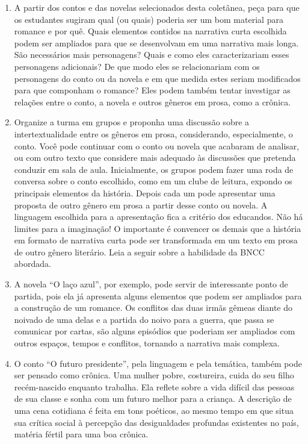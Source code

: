 \documentclass[12pt]{extarticle}
\begin{document}
\begin{enumerate}
\item
A partir dos contos e das novelas selecionados
desta coletânea, peça para que os estudantes sugiram qual (ou quais)
poderia ser um bom material para romance e por quê. Quais elementos
contidos na narrativa curta escolhida podem ser ampliados para que se
desenvolvam em uma narrativa mais longa. São necessários mais
personagens? Quais e como eles caracterizariam esses personagens
adicionais? De que modo eles se relacionariam com os personagens do
conto ou da novela e em que medida estes seriam modificados para que
componham o romance? Eles podem também tentar investigar as relações
entre o conto, a novela e outros gêneros em prosa, como a crônica.

\item
Organize a turma em grupos e proponha uma discussão sobre a
intertextualidade entre os gêneros em prosa, considerando,
especialmente, o conto. Você pode continuar com o conto ou novela que
acabaram de analisar, ou com outro texto que considere mais adequado às
discussões que pretenda conduzir em sala de aula. Inicialmente, os
grupos podem fazer uma roda de conversa sobre o conto escolhido, como em
um clube de leitura, expondo os principais elementos da história. Depois
cada um pode apresentar uma proposta de outro gênero em prosa a partir
desse conto ou novela. A linguagem escolhida para a apresentação fica a
critério dos educandos. Não há limites para a imaginação! O importante é
convencer os demais que a história em formato de narrativa curta pode
ser transformada em um texto em prosa de outro gênero literário.
Leia a seguir sobre a habilidade da BNCC abordada.

\item
A novela ``O laço azul'', por exemplo, pode servir de interessante
ponto de partida, pois ela já apresenta alguns elementos que podem ser
ampliados para a construção de um romance. Os conflitos das duas irmãs
gêmeas diante do noivado de uma delas e a partida do noivo para a
guerra, que passa se comunicar por cartas, são alguns episódios que
poderiam ser ampliados com outros espaços, tempos e conflitos, tornando a narrativa mais complexa.

\item
O conto ``O futuro presidente'', pela linguagem e pela temática,
também pode ser pensado como crônica. Uma mulher pobre, costureira,
cuida do seu filho recém-nascido enquanto trabalha. Ela reflete sobre a
vida difícil das pessoas de sua classe e sonha com um futuro melhor para
a criança. A descrição de uma cena cotidiana é feita em tons poéticos,
ao mesmo tempo em que situa sua crítica social à percepção das
desigualdades profundas existentes no país, matéria fértil para uma boa
crônica.
\end{enumerate}
\end{document}
